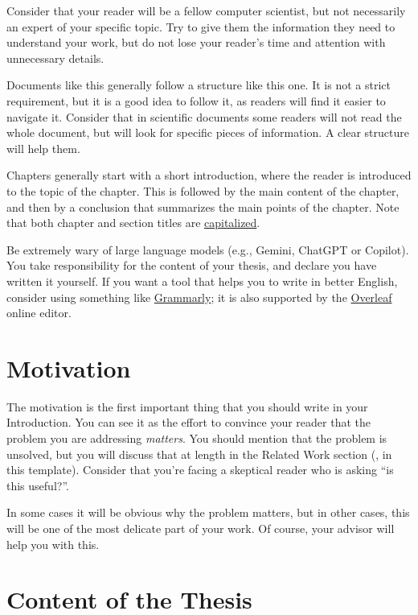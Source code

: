 Consider that your reader will be a fellow computer scientist, but not necessarily an expert
of your specific topic. Try to give them the information they need to understand your work, but
do not lose your reader's time and attention with unnecessary details.

Documents like this generally follow a structure like this one. It is not a strict
requirement, but it is a good idea to follow it, as readers will find it easier to navigate it.
Consider that in scientific documents some readers will not read the whole document,
but will look for specific pieces of information. A clear structure will help them.

Chapters generally start with a short introduction, where the reader is introduced to the topic
of the chapter. This is followed by the main content of the chapter, and then by a conclusion
that summarizes the main points of the chapter. Note that both chapter and section titles are
\href{https://www.grammarly.com/blog/capitalization-in-the-titles/}{capitalized}.

Be extremely wary of large language models (e.g., Gemini, ChatGPT or Copilot). You take
responsibility for the content of your thesis, and declare you have written it yourself.
If you want a tool that helps you to write in better English, consider using something like
\href{https://grammarly.com}{Grammarly}; it is also supported by the
\href{https://www.overleaf.com}{Overleaf} online \latex editor.

\section{Motivation}

The motivation is the first important thing that you should write in your Introduction.
You can see it as the effort to convince your reader that the problem you are addressing
\emph{matters}. You should mention that the problem is unsolved, but you will discuss that at
length in the Related Work section (, in this template). Consider that
you're facing a skeptical reader who is asking ``is this useful?''.

In some cases it will be obvious why the problem matters, but in other cases, this will be
one of the most delicate part of your work. Of course, your advisor will help you with this.

\section{Content of the Thesis}


